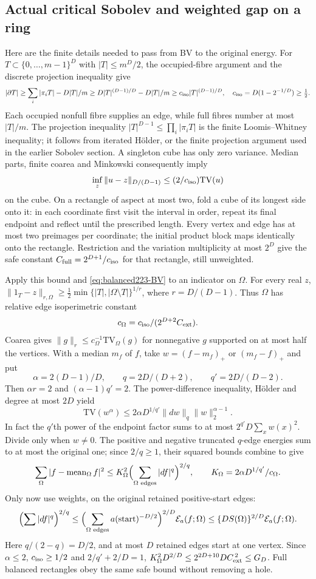 \subsection{Actual critical Sobolev and weighted gap on a ring}
Here are the finite details needed to pass from BV to the original energy.
For $T\subset\{0,\ldots,m-1\}^D$ with $|T|\le m^D/2$, the occupied-fibre
argument and the discrete projection inequality give
\[
 |\partial T|\ge\sum_i|\pi_iT|-D|T|/m
 \ge D|T|^{(D-1)/D}-D|T|/m
 \ge c_{\rm iso}|T|^{(D-1)/D},\quad
 c_{\rm iso}=D(1-2^{-1/D})\ge\tfrac12.
\]
Each occupied nonfull fibre supplies an edge, while full fibres number at
most $|T|/m$. The projection inequality
$|T|^{D-1}\le\prod_i|\pi_iT|$ is the finite Loomis--Whitney inequality;
it follows from iterated H\"older, or the finite projection argument used
in the earlier Sobolev section. A singleton cube has only zero variance.
Median parts, finite coarea and Minkowski consequently imply
\[
 \inf_z\|u-z\|_{D/(D-1)}\le(2/c_{\rm iso})\mathrm{TV}(u)
\]
on the cube. On a rectangle of aspect at most two, fold a cube of its
longest side onto it: in each coordinate first visit the interval in
order, repeat its final endpoint and reflect until the prescribed length.
Every vertex and edge has at most two preimages per coordinate; the
initial product block maps identically onto the rectangle. Restriction
and the variation multiplicity at most $2^D$ give the safe constant
$C_{\rm full}=2^{D+1}/c_{\rm iso}$ for that rectangle, still unweighted.

Apply this bound and \eqref{eq:balanced223-BV} to an indicator on $\Omega$.
For every real $z$,
$\|1_T-z\|_{r,\Omega}\ge\frac12\min\{|T|,|\Omega\setminus T|\}^{1/r}$,
where $r=D/(D-1)$. Thus $\Omega$ has relative edge isoperimetric constant
\[
 c_\Omega=c_{\rm iso}/(2^{D+2}C_{\rm ext}).
\]
Coarea gives $\|g\|_r\le c_\Omega^{-1}\mathrm{TV}_\Omega(g)$ for
nonnegative $g$ supported on at most half the vertices. With a median $m_f$
of $f$, take $w=(f-m_f)_+$ or $(m_f-f)_+$ and put
\[
 \alpha=2(D-1)/D,\qquad q=2D/(D+2),\qquad q'=2D/(D-2).
\]
Then $\alpha r=2$ and $(\alpha-1)q'=2$. The power-difference inequality,
H\"older and degree at most $2D$ yield
\[
 \mathrm{TV}(w^\alpha)
 \le2\alpha D^{1/q'}\|dw\|_q\|w\|_2^{\alpha-1}.
\]
In fact the $q'$th power of the endpoint factor sums to at most
$2^{q'}D\sum_xw(x)^2$. Divide only when $w\ne0$. The positive and
negative truncated $q$-edge energies sum to at most the original one;
since $2/q\ge1$, their squared bounds combine to give
\begin{equation}\label{eq:balanced223-q}
 \sum_\Omega|f-\operatorname{mean}_\Omega f|^2
 \le K_\Omega^2\Bigl(\sum_{\Omega\text{ edges}}|df|^q\Bigr)^{2/q},
 \qquad K_\Omega=2\alpha D^{1/q'}/c_\Omega.
\end{equation}
Only now use weights, on the original retained positive-start edges:
\[
 \Bigl(\sum |df|^q\Bigr)^{2/q}
 \le\Bigl(\sum_{\Omega\text{ edges}}a(\mathrm{start})^{-D/2}\Bigr)^{2/D}
       \mathcal E_a(f;\Omega)
 \le\{DS(\Omega)\}^{2/D}\mathcal E_a(f;\Omega).
\]
Here $q/(2-q)=D/2$, and at most $D$ retained edges start at one vertex.
Since $\alpha\le2$, $c_{\rm iso}\ge1/2$ and $2/q'+2/D=1$,
$K_\Omega^2D^{2/D}\le2^{2D+10}DC_{\rm ext}^{\,2}\le G_D$.
Full balanced rectangles obey the same safe bound without removing a hole.

